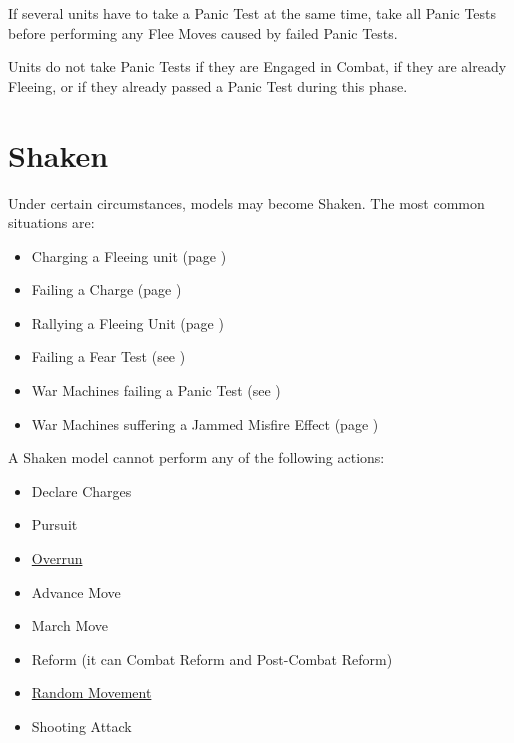 If several units have to take a Panic Test at the same time, take all Panic Tests before performing any Flee Moves caused by failed Panic Tests.

Units do not take Panic Tests if they are Engaged in Combat, if they are already Fleeing, or if they already passed a Panic Test during this phase.

\columnbreak

\section{Shaken}
\label{shaken}

Under certain circumstances, models may become Shaken. The most common situations are:

\begin{itemize}
\item Charging a Fleeing unit (page \pageref{charging_a_fleeing_unit})
\item Failing a Charge (page \pageref{failed_charge})
\item Rallying a Fleeing Unit (page \pageref{rally_fleeing_units})
\item Failing a Fear Test (see )
\item War Machines failing a Panic Test (see )
\item War Machines suffering a Jammed Misfire Effect (page \pageref{table/misfire})
\end{itemize}

\vspace*{5pt}

A Shaken model cannot perform any of the following actions:

\begin{itemize}
\item Declare Charges
\item Pursuit
\item \hyperref[overrun]{Overrun}
\item Advance Move
\item March Move
\item Reform (it can Combat Reform and Post-Combat Reform)
\item \hyperref[random_movement]{Random Movement}
\item Shooting Attack
\end{itemize}

\columnbreak

